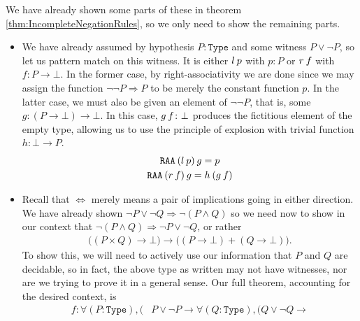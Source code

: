 \documentclass[11pt]{article}
\begin{document}
\begin{my proof}
We have already shown some parts of these in theorem \ref{thm:IncompleteNegationRules}, so we only need to show the remaining parts. \begin{itemize}
\item We have already assumed by hypothesis $P \colon \mathtt{Type}$ and some witness $P \vee \neg P$, so let us pattern match on this witness. It is either $l \hspace{0.2em} p$ with $p \colon P$ or $r \hspace{0.2em} f$ with $f \colon P \to \bot$. In the former case, by right-associativity we are done since we may assign the function $\neg \neg P \Rightarrow P$ to be merely the constant function $p$. In the latter case, we must also be given an element of $\neg \neg P$, that is, some $g\colon (P \to \bot) \to \bot$. In this case, $g \hspace{0.2em} f \colon \bot$ produces the fictitious element of the empty type, allowing us to use the principle of explosion with trivial function $h \colon \bot \to P$. \begin{gather*}
\mathtt{RAA} \hspace{0.2em} (l \hspace{0.2em} p) \hspace{0.2em} g = p \\
\mathtt{RAA} \hspace{0.2em} (r \hspace{0.2em} f) \hspace{0.2em} g = h \hspace{0.2em} (g \hspace{0.2em} f)
\end{gather*}
\item Recall that $\Leftrightarrow$ merely means a pair of implications going in either direction. We have already shown $\neg P \vee \neg Q \Rightarrow \neg (P \wedge Q)$ so we need now to show in our context that $\neg (P \wedge Q) \Rightarrow \neg P \vee \neg Q$, or rather \begin{gather*}
\big((P \times Q) \to \bot \big) \to \big( (P \to \bot) + (Q \to \bot) \big).
\end{gather*}
To show this, we will need to actively use our information that $P$ and $Q$ are decidable, so in fact, the above type as written may not have witnesses, nor are we trying to prove it in a general sense. Our full theorem, accounting for the desired context, is \begin{align*}
f \colon \forall (P : \mathtt{Type}), \bigg( & P \vee \neg P \to \forall (Q : \mathtt{Type}), \Big( Q \vee \neg Q \to  \\

\end{align*}
\end{itemize}
\end{my proof}
\end{document}
